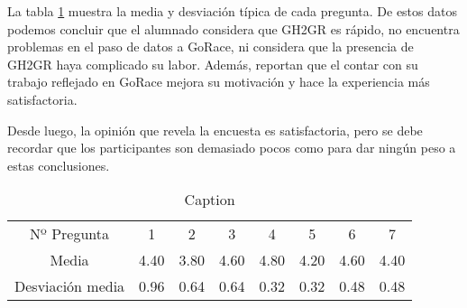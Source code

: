 La tabla \ref{tab:encuesta} muestra la media y desviación típica de cada pregunta. De estos datos podemos concluir que el alumnado considera que GH2GR es rápido, no encuentra problemas en el paso de datos a GoRace, ni considera que la presencia de GH2GR haya complicado su labor. Además, reportan que el contar con su trabajo reflejado en GoRace mejora su motivación y hace la experiencia más satisfactoria.

Desde luego, la opinión que revela la encuesta es satisfactoria, pero se debe recordar que los participantes son demasiado pocos como para dar ningún peso a estas conclusiones.

\begin{table}
    \centering
    \begin{tabular}{cccccccc}
         Nº Pregunta      & 1    & 2    & 3    & 4    & 5    & 6    & 7    \\
        Media            & 4.40 & 3.80 & 4.60 & 4.80 & 4.20 & 4.60 & 4.40 \\
        Desviación media & 0.96 & 0.64 & 0.64 & 0.32 & 0.32 & 0.48 & 0.48
    \end{tabular}
    \caption{Caption}
    \label{tab:encuesta}
\end{table}
